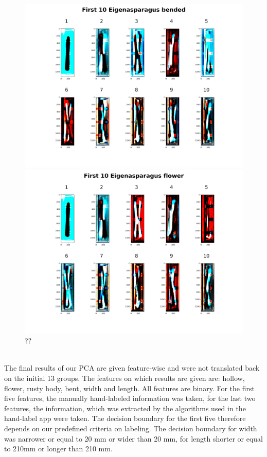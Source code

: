 \begin{figure}[h]
	\centering
	\includegraphics[scale=0.05]{Figures/chapter04/pc_bended}
	\decoRule
	\caption[??]{??}
	\label{fig:PrincipalComponentBended}
\bigbreak
	\includegraphics[scale=0.05]{Figures/chapter04/pc_blume}
	\decoRule
	\caption[??]{??}
	\label{fig:PrincipalComponentBlume}
\end{figure}
\\
The final results of our PCA are given feature-wise and were not translated back on the initial 13 groups. The features on which results are given are: hollow, flower, rusty body, bent, width and length. All features are binary. For the first five features, the manually hand-labeled information was taken, for the last two features, the information, which was extracted by the algorithms used in the hand-label app were taken. The decision boundary for the first five therefore depends on our predefined criteria on labeling. The decision boundary for width was narrower or equal to 20 mm or wider than 20 mm, for length shorter or equal to 210mm or longer than 210 mm. \\

